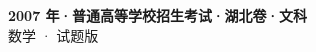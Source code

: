 \documentclass[zihao=-4, a4paper]{ctexart}
\begin{document}
\begin{center}
  {\Large\bfseries 2007 年·普通高等学校招生考试·湖北卷·文科}\\[4pt]
  {\large 数学 · 试题版}
\end{center}
\medskip
{}

\end{document}
